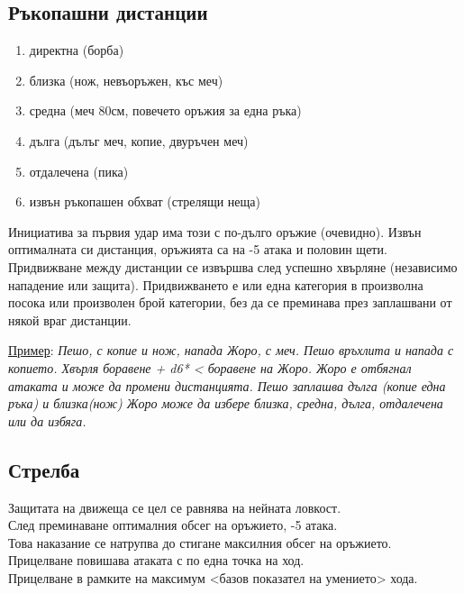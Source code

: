 \subsection{Ръкопашни дистанции}
\begin{multicols}{2}
\begin{enumerate}
\item{директна (борба)}
\item{близка (нож, невъоръжен, къс меч)}
\item{средна (меч 80см, повечето оръжия за една ръка)}
\item{дълга (дълъг меч, копие, двуръчен меч)}
\item{отдалечена (пика)}
\item{извън ръкопашен обхват (стрелящи неща)}
\end{enumerate}
Инициатива за първия удар има този с по-дълго оръжие (очевидно).
Извън оптималната си дистанция, оръжията са на -5 атака и половин щети.
Придвижване между дистанции се извършва след успешно хвърляне (независимо нападение или защита).
Придвижването е или една категория в произволна посока или произволен брой категории, без да се преминава през заплашвани от някой враг дистанции. 
\end{multicols}
\underline{Пример}:
\emph{Пешо, с копие и нож, напада Жоро, с меч.
Пешо връхлита и напада с копието.
Хвърля боравене + d6* < боравене на Жоро.
Жоро е отбягнал атаката и може да промени дистанцията.
Пешо заплашва дълга (копие една ръка) и близка(нож)
Жоро може да избере близка, средна, дълга, отдалечена или да избяга.
}

\subsection{Стрелба}
Защитата на движеща се цел се равнява на нейната ловкост.  \\
След преминаване оптималния обсег на оръжието, -5 атака.  \\
Това наказание се натрупва до стигане максилния обсег на оръжието.  \\
Прицелване повишава атаката с по една точка на ход.  \\
Прицелване в рамките на максимум <базов показател на умението> хода.

